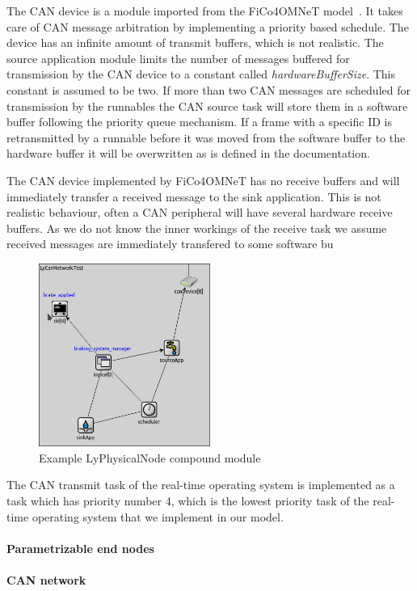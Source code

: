 The CAN device is a module imported from the FiCo4OMNeT model~\cite{meyer2019simulation}. It takes care of CAN message arbitration by implementing a priority based schedule. The device has an infinite amount of transmit buffers, which is not realistic. The source application module limits the number of messages buffered for transmission by the CAN device to a constant called \textit{hardwareBufferSize}. This constant is assumed to be two. If more than two CAN messages are scheduled for transmission by the runnables the CAN source task will store them in a software buffer following the priority queue mechanism. If a frame with a specific ID is retransmitted by a runnable before it was moved from the software buffer to the hardware buffer it will be overwritten as is defined in the documentation.

The CAN device implemented by FiCo4OMNeT has no receive buffers and will immediately transfer a received message to the sink application. This is not realistic behaviour, often a CAN peripheral will have several hardware receive buffers. As we do not know the inner workings of the receive task we assume received messages are immediately transfered to some software bu

\begin{figure}[htb]
    \centering
    \includegraphics[width=0.5\textwidth]{images/LyPhysicalNode_example.png}
    \caption{Example LyPhysicalNode compound module}
    \label{fig:lyphysicalnode}
\end{figure}

The CAN transmit task of the real-time operating system is implemented as a task which has priority number 4, which is the lowest priority task of the real-time operating system that we implement in our model.

\paragraph{Parametrizable end nodes}

\paragraph{CAN network}